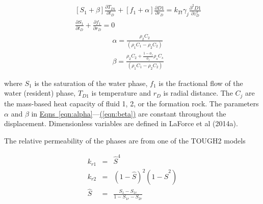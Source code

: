 \documentclass[12pt]{report}
\begin{document}
\begin{eqnarray}
&&\left[ S_1  + \beta \right]\frac{\partial T_{D1}}{\partial t_D} +
\left[  f_1  + \alpha\right] \frac{\partial {D1}}{\partial r_D} = k_{Tt}\gamma_j \frac{\partial^2 {D1}}{\partial z_D^2} \label{eqn:generic_T}\\
&&\frac{\partial S_1}{\partial t_D } + \frac{\partial f_1}{\partial r_D } = 0 \label{eqn:generic_S}
\end{eqnarray}
\begin{eqnarray}
&&\alpha = \frac{\rho_2  C_2}{\left(\rho_1  C_1  - \rho_2  C_2 \right)} \label{eqn:alpha}\\
&&\beta = \frac{\rho_2  C_2  + \frac{ 1-\phi_r }{\phi_r}\rho_s C_s }{\left(\rho_1  C_1  - \rho_2  C_2 \right)} \label{eqn:beta}
\end{eqnarray}

\noindent where $S_1$ is the saturation of the water phase, $f_1$ is
the fractional flow of the water (resident) phase, $T_{D1}$ is
temperature and $r_D$ is radial distance.  The $C_j$ are the
mass-based heat capacity of fluid 1, 2, or the formation rock.  The
parameters $\alpha$ and $\beta$ in
\hyperref[eqn:alpha]{Eqns~\ref*{eqn:alpha}}---\hyperref[eqn:beta]{(\ref*{eqn:beta})}
are constant throughout the displacement.  Dimensionless variables are
defined in LaForce et al (2014a).

%
%

The relative permeability of the phases are from one of the TOUGH2 models


\begin{eqnarray}
k_{r1} &=& \hat{S}^4 \nonumber\\
k_{r2} &=& \left(1-\hat{S}\right)^2 \left(1-\hat{S}^2\right)\\
\hat{S} &=& \frac{S_1-S_{1r}}{1-S_{1r}-S_{2r}}\nonumber
\end{eqnarray}
\end{document}
